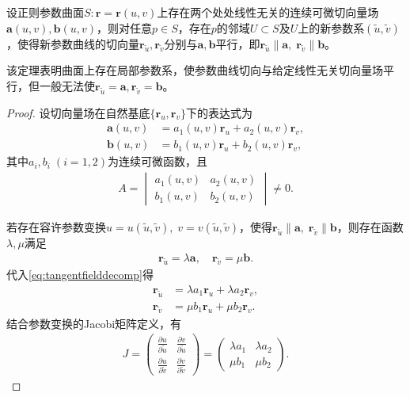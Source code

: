 \documentclass[../../main.tex]{subfiles}%
\begin{document}
\begin{theorem}
设正则参数曲面$S:\bm r=\bm r(u,v)$上存在两个处处线性无关的连续可微切向量场$\bm a(u,v),\bm b(u,v)$，则对任意$p\in S$，存在$p$的邻域$U\subset S$及$U$上的新参数系$(\tilde u,\tilde v)$，使得新参数曲线的切向量$\bm r_{\tilde u},\bm r_{\tilde v}$分别与$\bm a,\bm b$平行，即$\bm r_{\tilde u}\parallel\bm a,\;\bm r_{\tilde v}\parallel\bm b$。
\end{theorem}
\begin{remark}
该定理表明曲面上存在局部参数系，使参数曲线切向与给定线性无关切向量场平行，但一般无法使$\bm r_{\tilde u}=\bm a,\bm r_{\tilde v}=\bm b$。
\end{remark}
\begin{proof}

设切向量场在自然基底$\{\bm r_u,\bm r_v\}$下的表达式为
\begin{align}
\bm a(u,v) &= a_1(u,v)\bm r_u + a_2(u,v)\bm r_v,\nonumber\\
\bm b(u,v) &= b_1(u,v)\bm r_u + b_2(u,v)\bm r_v,
\label{eq:tangentfielddecomp}
\end{align}
其中$a_i,b_i\;(i=1,2)$为连续可微函数，且
\begin{align}
A=\begin{vmatrix}a_1(u,v)&a_2(u,v)\\b_1(u,v)&b_2(u,v)\end{vmatrix}\neq0.
\label{eq:detnonzero}
\end{align}

若存在容许参数变换$u=u(\tilde u,\tilde v),\;v=v(\tilde u,\tilde v)$，使得$\bm r_{\tilde u}\parallel\bm a,\;\bm r_{\tilde v}\parallel\bm b$，则存在函数$\lambda,\mu$满足
\begin{align}
\bm r_{\tilde u}=\lambda\bm a,\quad \bm r_{\tilde v}=\mu\bm b.
\label{eq:paralleltangentvec}
\end{align}
代入\eqref{eq:tangentfielddecomp}得
\begin{align*}
\bm r_{\tilde u}&=\lambda a_1\bm r_u+\lambda a_2\bm r_v,\\
\bm r_{\tilde v}&=\mu b_1\bm r_u+\mu b_2\bm r_v.
\end{align*}
结合参数变换的Jacobi矩阵定义，有
\begin{align}
J=\begin{pmatrix}
\frac{\partial u}{\partial\tilde u}&\frac{\partial v}{\partial\tilde u}\\
\frac{\partial u}{\partial\tilde v}&\frac{\partial v}{\partial\tilde v}
\end{pmatrix}
=\begin{pmatrix}
\lambda a_1&\lambda a_2\\
\mu b_1&\mu b_2
\end{pmatrix}.
\label{eq:jacobiorig}
\end{align}


\end{proof}
\end{document}
